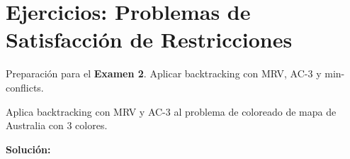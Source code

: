 \section{Ejercicios: Problemas de Satisfacción de Restricciones}


Preparación para el \textbf{Examen 2}. Aplicar backtracking con MRV, AC-3 y min-conflicts.


\begin{exercise}
Aplica backtracking con MRV y AC-3 al problema de coloreado de mapa de Australia con 3 colores.

\textbf{Solución:}
\end{exercise}
